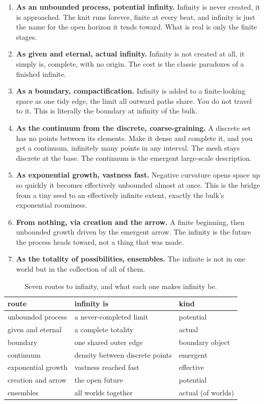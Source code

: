 \begin{enumerate}
\item \textbf{As an unbounded process, potential infinity.} Infinity is never created, it is approached. The knit runs forever, finite at every beat, and infinity is just the name for the open horizon it tends toward. What is real is only the finite stages.
\item \textbf{As given and eternal, actual infinity.} Infinity is not created at all, it simply is, complete, with no origin. The cost is the classic paradoxes of a finished infinite.
\item \textbf{As a boundary, compactification.} Infinity is added to a finite-looking space as one tidy edge, the limit all outward paths share. You do not travel to it. This is literally the boundary at infinity of the bulk.
\item \textbf{As the continuum from the discrete, coarse-graining.} A discrete set has no points between its elements. Make it dense and complete it, and you get a continuum, infinitely many points in any interval. The mesh stays discrete at the base. The continuum is the emergent large-scale description.
\item \textbf{As exponential growth, vastness fast.} Negative curvature opens space up so quickly it becomes effectively unbounded almost at once. This is the bridge from a tiny seed to an effectively infinite extent, exactly the bulk's exponential roominess.
\item \textbf{From nothing, via creation and the arrow.} A finite beginning, then unbounded growth driven by the emergent arrow. The infinity is the future the process heads toward, not a thing that was made.
\item \textbf{As the totality of possibilities, ensembles.} The infinite is not in one world but in the collection of all of them.
\end{enumerate}

\begin{table}[ht]
\centering
\begin{tabular}{@{}lll@{}}
\toprule
route & infinity is & kind \\
\midrule
unbounded process & a never-completed limit & potential \\
given and eternal & a complete totality & actual \\
boundary & one shared outer edge & boundary object \\
continuum & density between discrete points & emergent \\
exponential growth & vastness reached fast & effective \\
creation and arrow & the open future & potential \\
ensembles & all worlds together & actual (of worlds) \\
\bottomrule
\end{tabular}
\caption{Seven routes to infinity, and what each one makes infinity be.}
\label{tab:infinity-routes}
\end{table}

